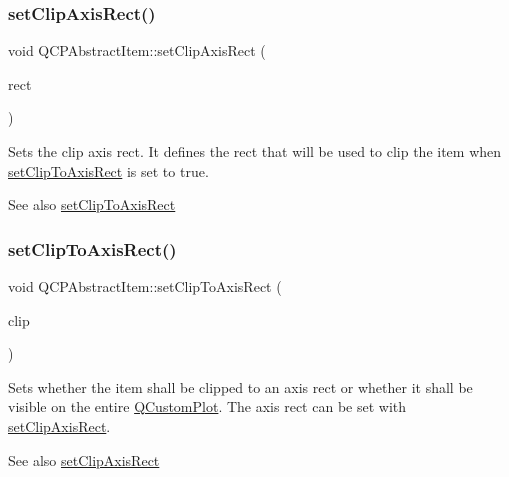 \subsubsection{\texorpdfstring{set\+Clip\+Axis\+Rect()}{setClipAxisRect()}}
{\footnotesize\ttfamily void Q\+C\+P\+Abstract\+Item\+::set\+Clip\+Axis\+Rect (\begin{DoxyParamCaption}\item[{\hyperlink{class_q_c_p_axis_rect}{Q\+C\+P\+Axis\+Rect} $\ast$}]{rect }\end{DoxyParamCaption})}

Sets the clip axis rect. It defines the rect that will be used to clip the item when \hyperlink{class_q_c_p_abstract_item_a39e05b9d4176b9accafc746d16ca6a06}{set\+Clip\+To\+Axis\+Rect} is set to true.

\begin{DoxySeeAlso}{See also}
\hyperlink{class_q_c_p_abstract_item_a39e05b9d4176b9accafc746d16ca6a06}{set\+Clip\+To\+Axis\+Rect} 
\end{DoxySeeAlso}
\mbox{\label{class_q_c_p_abstract_item_a39e05b9d4176b9accafc746d16ca6a06}} 
\subsubsection{\texorpdfstring{set\+Clip\+To\+Axis\+Rect()}{setClipToAxisRect()}}
{\footnotesize\ttfamily void Q\+C\+P\+Abstract\+Item\+::set\+Clip\+To\+Axis\+Rect (\begin{DoxyParamCaption}\item[{bool}]{clip }\end{DoxyParamCaption})}

Sets whether the item shall be clipped to an axis rect or whether it shall be visible on the entire \hyperlink{class_q_custom_plot}{Q\+Custom\+Plot}. The axis rect can be set with \hyperlink{class_q_c_p_abstract_item_a7dc75fcbcd10206fe0b75d757ea7a347}{set\+Clip\+Axis\+Rect}.

\begin{DoxySeeAlso}{See also}
\hyperlink{class_q_c_p_abstract_item_a7dc75fcbcd10206fe0b75d757ea7a347}{set\+Clip\+Axis\+Rect} 
\end{DoxySeeAlso}
\mbox{\label{class_q_c_p_abstract_item_a8a8e32a55bc478b849756a78c2d87fd2}} 
